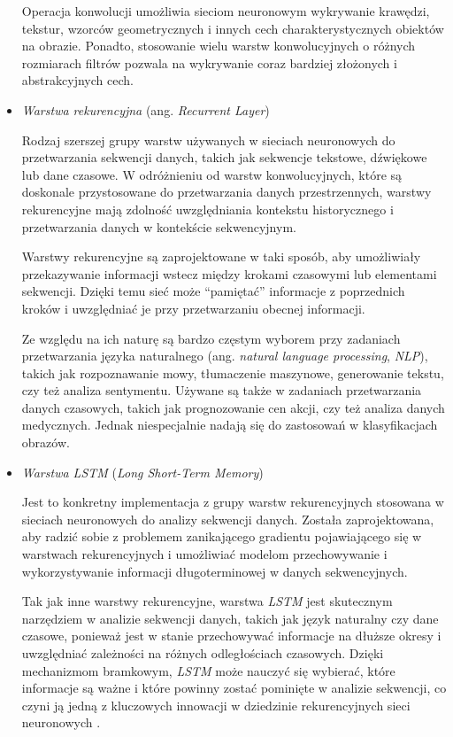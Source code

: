 \begin{itemize}
        Operacja konwolucji umożliwia sieciom neuronowym wykrywanie krawędzi, tekstur, wzorców geometrycznych i innych cech charakterystycznych obiektów na obrazie.
        Ponadto, stosowanie wielu warstw konwolucyjnych o różnych rozmiarach filtrów pozwala na wykrywanie coraz bardziej złożonych i abstrakcyjnych cech.

  \item \emph{Warstwa rekurencyjna} (ang. \emph{Recurrent Layer})

        Rodzaj szerszej grupy warstw używanych w sieciach neuronowych do przetwarzania sekwencji danych, takich jak sekwencje tekstowe, dźwiękowe lub dane czasowe.
        W odróżnieniu od warstw konwolucyjnych, które są doskonale przystosowane do przetwarzania danych przestrzennych, warstwy rekurencyjne mają zdolność uwzględniania kontekstu historycznego i przetwarzania danych w kontekście sekwencyjnym.

        Warstwy rekurencyjne są zaprojektowane w taki sposób, aby umożliwiały przekazywanie informacji wstecz między krokami czasowymi lub elementami sekwencji.
        Dzięki temu sieć może ``pamiętać'' informacje z poprzednich kroków i uwzględniać je przy przetwarzaniu obecnej informacji.

        Ze względu na ich naturę są bardzo częstym wyborem przy zadaniach przetwarzania języka naturalnego (ang. \emph{natural language processing}, \emph{NLP}), takich jak rozpoznawanie mowy, tłumaczenie maszynowe, generowanie tekstu, czy też analiza sentymentu.
        Używane są także w zadaniach przetwarzania danych czasowych, takich jak prognozowanie cen akcji, czy też analiza danych medycznych.
        Jednak niespecjalnie nadają się do zastosowań w klasyfikacjach obrazów.

  \item \emph{Warstwa LSTM} (\emph{Long Short-Term Memory})

        Jest to konkretny implementacja z grupy warstw rekurencyjnych stosowana w sieciach neuronowych do analizy sekwencji danych.
        Została zaprojektowana, aby radzić sobie z problemem zanikającego gradientu pojawiającego się w warstwach rekurencyjnych i umożliwiać modelom przechowywanie i wykorzystywanie informacji długoterminowej w danych sekwencyjnych.

        Tak jak inne warstwy rekurencyjne, warstwa \emph{LSTM} jest skutecznym narzędziem w analizie sekwencji danych, takich jak język naturalny czy dane czasowe, ponieważ jest w stanie przechowywać informacje na dłuższe okresy i uwzględniać zależności na różnych odległościach czasowych.
        Dzięki mechanizmom bramkowym, \emph{LSTM} może nauczyć się wybierać, które informacje są ważne i które powinny zostać pominięte w analizie sekwencji, co czyni ją jedną z kluczowych innowacji w dziedzinie rekurencyjnych sieci neuronowych \cite{staudemeyer2019understanding}.


\end{itemize}
